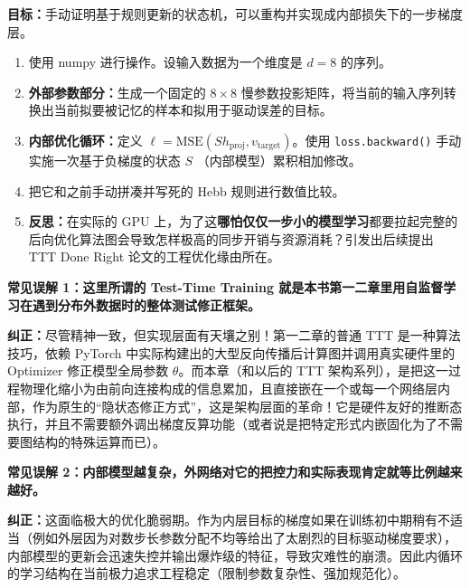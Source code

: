 \begin{labbox}[title=Lab 7: 通过定义内部损失反推网络状态更新层]
\textbf{目标：}手动证明基于规则更新的状态机，可以重构并实现成内部损失下的一步梯度层。

\begin{enumerate}
    \item 使用 numpy 进行操作。设输入数据为一个维度是 $d=8$ 的序列。
    \item \textbf{外部参数部分：}生成一个固定的 $8\times8$ 慢参数投影矩阵，将当前的输入序列转换出当前拟要被记忆的样本和拟用于驱动误差的目标。
    \item \textbf{内部优化循环：}定义 $\ell = \text{MSE}(S h_{\text{proj}} , v_{\text{target}})$。使用 \texttt{loss.backward()} 手动实施一次基于负梯度的状态 $S$ （内部模型）累积相加修改。
    \item 把它和之前手动拼凑并写死的 Hebb 规则进行数值比较。
    \item \textbf{反思：}在实际的 GPU 上，为了这\textbf{哪怕仅仅一步小的模型学习}都要拉起完整的后向优化算法图会导致怎样极高的同步开销与资源消耗？引发出后续提出 TTT Done Right 论文的工程优化缘由所在。
\end{enumerate}
\end{labbox}

\begin{misconceptionbox}
\textbf{常见误解 1：这里所谓的 Test-Time Training 就是本书第一二章里用自监督学习在遇到分布外数据时的整体测试修正框架。}

\textbf{纠正：}尽管精神一致，但实现层面有天壤之别！第一二章的普通 TTT 是一种算法技巧，依赖 PyTorch 中实际构建出的大型反向传播后计算图并调用真实硬件里的 Optimizer 修正模型全局参数 $\theta$。而本章（和以后的 TTT 架构系列），是把这一过程物理化缩小为由前向连接构成的信息累加，且直接嵌在一个或每一个网络层内部，作为原生的“隐状态修正方式”，这是架构层面的革命！它是硬件友好的推断态执行，并且不需要额外调出梯度反算功能（或者说是把特定形式内嵌固化为了不需要图结构的特殊运算而已）。
\end{misconceptionbox}

\begin{misconceptionbox}
\textbf{常见误解 2：内部模型越复杂，外网络对它的把控力和实际表现肯定就等比例越来越好。}

\textbf{纠正：}这面临极大的优化脆弱期。作为内层目标的梯度如果在训练初中期稍有不适当（例如外层因为对数步长参数分配不均等给出了太剧烈的目标驱动梯度要求），内部模型的更新会迅速失控并输出爆炸级的特征，导致灾难性的崩溃。因此内循环的学习结构在当前极力追求工程稳定（限制参数复杂性、强加规范化）。
\end{misconceptionbox}

